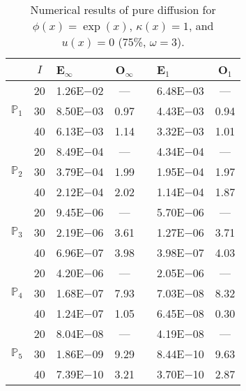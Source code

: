 \begin{table}[H]
\centering
\caption{Numerical results of pure diffusion for $\phi(x)=\exp(x)$, $\kappa(x)=1$, and $u(x)=0$ (75\%, $\omega=3$).}
\begin{tabular}{@{}l c l c c l c@{}}
\toprule
 & $I$ & E$_{\infty}$ & O$_{\infty}$ && E$_1$ & O$_1$\\
\midrule
\multirow{3}{*}{$\mathbb{P}_{1}$}
 & 20 & 1.26E$-$02 & --- && 6.48E$-$03 & ---\\
 & 30 & 8.50E$-$03 & 0.97 && 4.43E$-$03 & 0.94\\
 & 40 & 6.13E$-$03 & 1.14 && 3.32E$-$03 & 1.01\\
\midrule
\multirow{3}{*}{$\mathbb{P}_{2}$}
 & 20 & 8.49E$-$04 & --- && 4.34E$-$04 & ---\\
 & 30 & 3.79E$-$04 & 1.99 && 1.95E$-$04 & 1.97\\
 & 40 & 2.12E$-$04 & 2.02 && 1.14E$-$04 & 1.87\\
\midrule
\multirow{3}{*}{$\mathbb{P}_{3}$}
 & 20 & 9.45E$-$06 & --- && 5.70E$-$06 & ---\\
 & 30 & 2.19E$-$06 & 3.61 && 1.27E$-$06 & 3.71\\
 & 40 & 6.96E$-$07 & 3.98 && 3.98E$-$07 & 4.03\\
\midrule
\multirow{3}{*}{$\mathbb{P}_{4}$}
 & 20 & 4.20E$-$06 & --- && 2.05E$-$06 & ---\\
 & 30 & 1.68E$-$07 & 7.93 && 7.03E$-$08 & 8.32\\
 & 40 & 1.24E$-$07 & 1.05 && 6.45E$-$08 & 0.30\\
\midrule
\multirow{3}{*}{$\mathbb{P}_{5}$}
 & 20 & 8.04E$-$08 & --- && 4.19E$-$08 & ---\\
 & 30 & 1.86E$-$09 & 9.29 && 8.44E$-$10 & 9.63\\
 & 40 & 7.39E$-$10 & 3.21 && 3.70E$-$10 & 2.87\\
\bottomrule
\end{tabular}
\end{table}